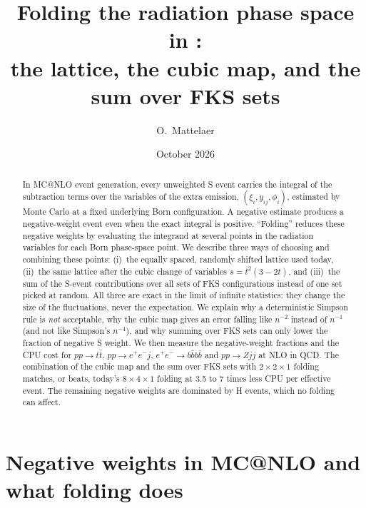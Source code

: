 \documentclass[11pt,a4paper]{article}
\title{Folding the radiation phase space in \mcatnlo:\\
the lattice, the cubic map, and the sum over FKS sets}
\author{O.~Mattelaer}
\date{October 2026}
\makeatletter
\newcommand{\mcatnlo}{\textsc{MC@NLO}}
\makeatother
\begin{document}
\maketitle

\begin{abstract}
In \mcatnlo{} event generation, every unweighted S event carries the integral of the
subtraction terms over the variables of the extra emission, $(\xi_i,y_{ij},\phi_i)$, estimated
by Monte Carlo at a fixed underlying Born configuration. A negative estimate produces a
negative-weight event even when the exact integral is positive. ``Folding'' reduces these
negative weights by evaluating the integrand at several points in the radiation variables for each Born
phase-space point. We describe three ways of choosing and combining these points:
(i)~the equally spaced, randomly shifted lattice used today,
(ii)~the same lattice after the cubic change of variables $s=t^2(3-2t)$, and
(iii)~the sum of the S-event contributions over all sets of FKS configurations instead of
one set picked at random. All three are exact in the limit of infinite statistics: they change the size of the
fluctuations, never the expectation. We explain why a deterministic Simpson rule is
\emph{not} acceptable, why the cubic map gives an error falling like $n^{-2}$ instead of
$n^{-1}$ (and not like Simpson's $n^{-4}$), and why summing over FKS sets can only lower the
fraction of negative S weight. We then measure the negative-weight fractions and the CPU cost
for $pp\to t\bar t$, $pp\to e^+e^-j$, $e^+e^-\to b\bar b b\bar b$ and $pp\to Zjj$ at NLO in
QCD. The combination of the cubic map and the sum over FKS sets with $2\times2\times1$
folding matches, or beats, today's $8\times4\times1$ folding at 3.5 to 7 times less CPU per
effective event. The remaining negative weights are dominated by H events, which no
folding can affect.
\end{abstract}

\tableofcontents

\section{Negative weights in \mcatnlo{} and what folding does}
\label{sec:intro}
\end{document}
